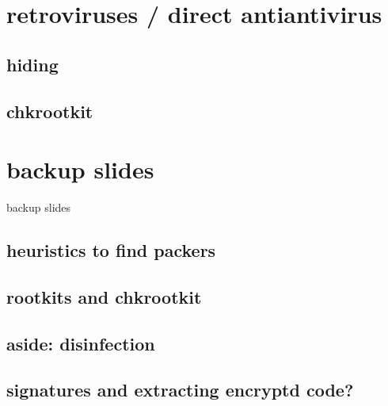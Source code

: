 \section{retroviruses / direct antiantivirus}


\subsection{hiding}


\subsection{chkrootkit}



\section{backup slides}
\begin{frame}{backup slides}
\end{frame}

\subsection{heuristics to find packers}


\subsection{rootkits and chkrootkit}


\subsection{aside: disinfection}


\subsection{signatures and extracting encryptd code?}

